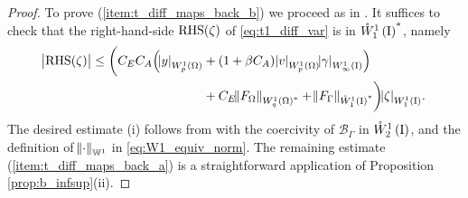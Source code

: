 \documentclass[final]{siamltex}
\begin{document}
\begin{proof} 
To prove (\ref{item:t_diff_maps_back_b}) we proceed as in .
It suffices to check that the right-hand-side ${{\textnormal{{RHS}}}}(\zeta)$ of \eqref{eq:t1_diff_var} is in ${{\mathring{W}^{1}_{1}\del{{\text{\rm I}}}}}^*$, namely
	\begin{align*}
		\abs{{{\textnormal{{RHS}}}}(\zeta)} \leq 
			\bigg(C_EC_A\Big({\abs{{y}}_{{W^{{{1}}}_{{{p}}}\del{{{\Omega}}}}}} 
				&+ \del{1+\beta C_A}{\abs{{v}}_{{W^{{1}}_{{p}}\del{{\Omega}}}}}{\abs{{\gamma}}_{{W^{{1}}_{{\infty}}\del{{\text{\rm I}}}}}}\Big) 
			    \\
				&+ C_E{\norm{{F_\Omega}}_{{{W^{{1}}_{{q}}\del{{\Omega}}}}^*}} 
				+ {\norm{{F_\Gamma}}_{{{\mathring{W}^{{1}}_{{1}}\del{{{\text{\rm I}}}}}}^*}} 
			 \bigg){\abs{{\zeta}}_{{W^{{{1}}}_{{{1}}}\del{{\text{\rm I}}}}}} .
	\end{align*}
The desired estimate (i) follows from  with the coercivity of ${{\mathcal{B}}_\Gamma}$ in ${{\mathring{W}^{{1}}_{{2}}\del{{\text{\rm I}}}}}$,  
and the definition of $\norm\cdot_{{\mathbb{W}}^1}$ in \eqref{eq:W1_equiv_norm}.
The remaining estimate (\ref{item:t_diff_maps_back_a}) is a straightforward
application of Proposition \ref{prop:b_infsup}(ii).
\end{proof}
\end{document}
